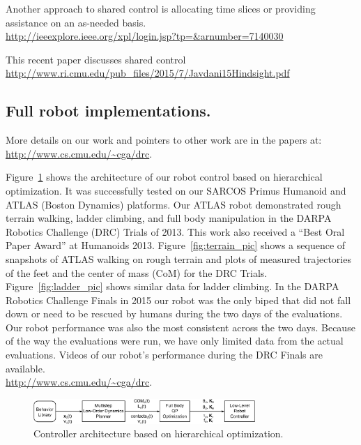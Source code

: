 \documentclass[letterpaper,12pt,fullpage]{article}
\begin{document}
Another approach to shared control is allocating time slices or providing assistance
on an as-needed basis.\\
\url{http://ieeexplore.ieee.org/xpl/login.jsp?tp=&arnumber=7140030}

This recent paper discusses shared control\\
\url{http://www.ri.cmu.edu/pub_files/2015/7/Javdani15Hindsight.pdf}

\subsection{Full robot implementations.}

More details on our work and pointers to other work are in the papers at:\\
\url{http://www.cs.cmu.edu/~cga/drc}.

Figure~\ref{f:cga1} shows the architecture of our robot control based on hierarchical optimization. 
It was successfully tested on our SARCOS Primus Humanoid
and ATLAS (Boston Dynamics) platforms. Our ATLAS robot demonstrated rough terrain walking, ladder climbing, and full body manipulation in the DARPA Robotics Challenge (DRC) Trials of 2013. This work also received 
a ``Best Oral Paper Award'' at Humanoids 2013. Figure~\ref{fig:terrain_pic} shows a sequence of snapshots of ATLAS 
walking on rough terrain and plots of measured trajectories of the feet and the center of mass (CoM) for the DRC Trials.
Figure~\ref{fig:ladder_pic} shows similar data for ladder climbing.
In the DARPA Robotics Challenge Finals in 2015 our robot was the only
biped that did not fall down or need to be rescued by 
humans during the two days of the evaluations.
Our robot performance was also the most consistent across the two days.
Because of the way the evaluations were run, we have only limited data
from the actual evaluations. Videos of our robot's performance during the
DRC Finals are available.\\
\url{http://www.cs.cmu.edu/~cga/drc}.


\begin{figure}[t!]
\centering
\includegraphics[width=0.75\textwidth]{Figures/cga1_modified}
\caption{Controller architecture based on hierarchical optimization.}
\label{f:cga1}
\end{figure}
\end{document}
